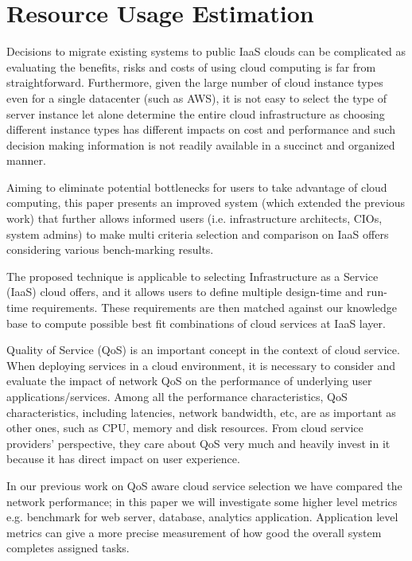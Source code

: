 \chapter{Resource Usage Estimation}
\label{cha:ResourceUsageEstimation}
Decisions to migrate existing systems to public IaaS clouds can be complicated as evaluating the benefits, risks and costs of using cloud computing is far from straightforward. Furthermore, given the large number of cloud instance types even for a single datacenter (such as AWS), it is not easy to select the type of server instance let alone determine the entire cloud infrastructure as choosing different instance types has different impacts on cost and performance and such decision making information is not readily available in a succinct and organized manner.

Aiming to eliminate potential bottlenecks for users to take advantage of cloud computing, this paper presents an improved system (which extended the previous work) that further allows informed users (i.e. infrastructure architects, CIOs, system admins) to make multi criteria selection and comparison on IaaS offers considering various bench-marking results. 

The proposed technique is applicable to selecting Infrastructure as a Service (IaaS) cloud offers, and it allows users to define multiple design-time and run-time requirements. These requirements are then matched against our knowledge base to compute possible best fit combinations of cloud services at IaaS layer. 

Quality of Service (QoS) is an important concept in the context of cloud service. When deploying services in a cloud environment, it is necessary to consider and evaluate the impact of network QoS on the performance of underlying user applications/services. Among all the performance characteristics, QoS characteristics, including latencies, network bandwidth, etc, are as important as other ones, such as CPU, memory and disk resources. From cloud service providers’ perspective, they care about QoS very much and heavily invest in it because it has direct impact on user experience. 

In our previous work on QoS aware cloud service selection we have compared the network performance; in this paper we will investigate some higher level metrics e.g. benchmark for web server, database, analytics application. Application level metrics can give a more precise measurement of how good the overall system completes assigned tasks.

